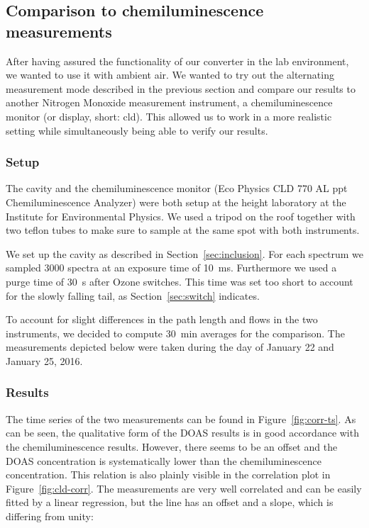 \subsection{Comparison to chemiluminescence measurements}
\label{sec:cld}

After having assured the functionality of our converter in the lab
environment, we wanted to use it with ambient air. We wanted to try
out the alternating measurement mode described in the previous section
and compare our results to another Nitrogen Monoxide measurement
instrument, a chemiluminescence monitor (or display, short: cld). This
allowed us to  work in a more realistic setting while
simultaneously being able to verify our results.

\subsubsection{Setup}
\label{sec:cld-setup}

The cavity and the chemiluminescence monitor (Eco Physics CLD 770 AL
ppt Chemiluminescence  Analyzer) were both setup at the height
laboratory at the Institute for Environmental Physics. We used a
tripod on the roof together with two teflon tubes to make sure to
sample at the same spot with both instruments.

We set up the cavity as described in Section~\ref{sec:inclusion}. For
each spectrum we sampled 3000 spectra at an exposure time of
\SI{10}{\milli\second}. Furthermore we used a purge time of
\SI{30}{\second} after Ozone switches. This time was set too short to
account for the slowly falling tail, as Section~\ref{sec:switch}
indicates.

To account for slight differences in the path length and flows in the
two instruments, we decided to compute \SI{30}{\minute} averages for
the comparison. The measurements depicted below were taken during the
day of January 22 and January 25, 2016.

\subsubsection{Results}
\label{sec:cld-results}

The time series of the two measurements can be found in
Figure~\ref{fig:corr-ts}. As can be seen, the qualitative form of the
DOAS results is in good accordance with the chemiluminescence results.
However, there seems to be an offset and the DOAS concentration is
systematically lower than the chemiluminescence concentration. This
relation is also plainly visible in the correlation plot in
Figure~\ref{fig:cld-corr}. The measurements are very well correlated
and can be easily fitted by a linear regression, but the line has an
offset and a slope, which is differing from unity:

